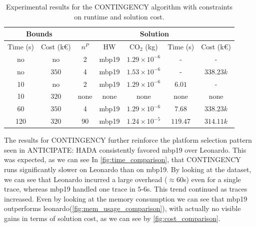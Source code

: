 \documentclass[a4paper,singleside,12pt]{report} %
\begin{document}
\begin{table}[h!]
    \centering
    \begin{tabular}{|cc|ccccc|}
        \hline
        \multicolumn{2}{|c|}{Bounds} & \multicolumn{5}{c|}{Solution} \\
        \hline
        Time (s) & Cost (k€) & $n^P$ & HW & CO$_2$ (kg) & Time (s) & Cost (k€) \\
        \hline
        no & no & 2 & mbp19 & $1.29 \times 10^{-6}$ & - & - \\
        no & $350$ & 4 & mbp19 & $1.53 \times 10^{-6}$ & - & $338.23k$ \\
        10 & no & 2 & mbp19 & $1.29 \times 10^{-6}$ & $6.01$ & - \\
        10 & $320$ & none & none & none & none & none \\
        60 & $350$ & 4 & mbp19 & $1.29 \times 10^{-6}$ & $7.68$ & $338.23k$ \\
        120 & $320$ & 90 & mbp19 & $1.24 \times 10^{-5}$ & $119.47$ & $314.11k$ \\
        \hline
    \end{tabular}
    \caption{Experimental results for the CONTINGENCY algorithm with constraints on runtime and solution cost.}
    \label{tab:contingency_results}
\end{table}

The results for CONTINGENCY further reinforce the platform selection pattern seen in ANTICIPATE: HADA consistently favored mbp19 over Leonardo. This was expected, as we can see In
\ref{fig:time_comparison}, that CONTINGENCY runs significantly slower on Leonardo than on mbp19. By looking at the dataset, we can see that Leonardo incurred a large overhead ($\approx60$s) 
even for a single trace, whereas mbp19 handled one trace in $5$-$6$s. This trend continued as traces increased. Even by looking at the memory consumption we can see that mbp19 outperforms
leonardo(\ref{fig:mem_usage_comparison}), with actually no visible gains in terms of solution cost, as we can see by \ref{fig:cost_comparison}. 
\end{document}
